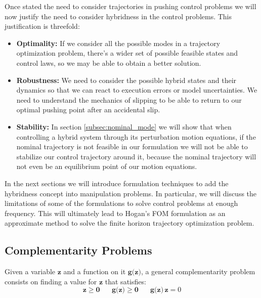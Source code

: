 \documentclass[12,twoside]{TFG-GM}
\theoremstyle{definition}
\theoremstyle{remark}
\begin{document}
Once stated the need to consider trajectories in pushing control problems we will now justify the need to consider hybridness in the control problems. This justification is threefold:

\begin{itemize}
\item {\textbf{Optimality:}} If we consider all the possible modes in a trajectory optimization problem, there's a wider set of possible feasible states and control laws, so we may be able to obtain a better solution.
\item {\textbf{Robustness:}} We need to consider the possible hybrid states and their dynamics so that we can react to execution errors or model uncertainties. We need to understand the mechanics of slipping to be able to return to our optimal pushing point after an accidental slip.
\item {\textbf{Stability:}} In section \ref{subsec:nominal_mode} we will show that when controlling a hybrid system through its perturbation motion equations, if the nominal trajectory is not feasible in our formulation we will not be able to stabilize our control trajectory around it, because the nominal trajectory will not even be an equilibrium point of our motion equations.
\end{itemize}

In the next sections we will introduce formulation techniques to add the hybridness concept into manipulation problems. In particular, we will discuss the limitations of some of the formulations to solve control problems at enough frequency. This will ultimately lead to Hogan's FOM formulation as an approximate method to solve the finite horizon trajectory optimization problem.

\subsection{Complementarity Problems}
\label{subsec:comp_prob}
Given a variable $\textbf{z}$ and a function on it $\textbf{g(z)}$, a general complementarity problem consists on finding a value for $\textbf{z}$ that satisfies:
$$ \textbf{z} \geq \textbf{0} \,\,\,\,\,\,\,\,\,\, \textbf{g(z)} \geq \textbf{0} \,\,\,\,\,\,\,\,\,\, \textbf{g(z)} \, \textbf{z} = 0$$
\end{document}
